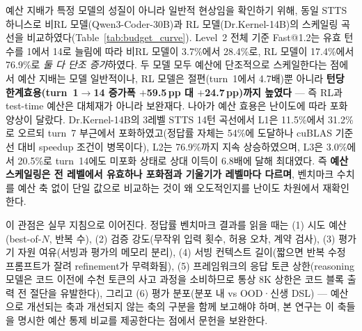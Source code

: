 \documentclass[sigplan,screen,review,anonymous]{acmart}
\begin{document}
\begin{table}[t]
\centering
\caption{STTS 턴 수에 따른 Fast@1.2(전체) 곡선(단위 \%). 동일 KernelGYM STTS 하니스에서 유효 턴 수만 1$\to$14로 확장하여 측정하였다. Qwen3-30B는 비RL 모델, Dr.Kernel-14B(DrK)는 커널 특화 RL 모델이다. 두 모델 모두 예산에 단조 스케일하나, RL 모델은 절편과 턴당 기울기를 모두 높이며, 레벨별로 포화점(L1 turn~7 부근)과 기울기(L3 미포화)가 다르다.}
\label{tab:budget_curve}
\end{table}

예산 지배가 특정 모델의 성질이 아니라 일반적 현상임을 확인하기 위해, 동일 STTS 하니스로 비RL 모델(Qwen3-Coder-30B)과 RL 모델(Dr.Kernel-14B)의 스케일링 곡선을 비교하였다(Table~\ref{tab:budget_curve}). Level~2 전체 기준 Fast@1.2는 유효 턴 수를 1에서 14로 늘림에 따라 비RL 모델이 3.7\%에서 28.4\%로, RL 모델이 17.4\%에서 76.9\%로 \emph{둘 다 단조 증가}하였다. 두 모델 모두 예산에 단조적으로 스케일한다는 점에서 예산 지배는 모델 일반적이나, RL 모델은 절편(turn~1에서 4.7배)뿐 아니라 \textbf{턴당 한계효용(turn~1$\to$14 증가폭 $+$59.5\,pp 대 $+$24.7\,pp)까지 높였다} --- 즉 RL과 test-time 예산은 대체재가 아니라 보완재다. 나아가 예산 효용은 난이도에 따라 포화 양상이 달랐다. Dr.Kernel-14B의 3레벨 STTS 14턴 곡선에서 L1은 11.5\%에서 31.2\%로 오르되 turn~7 부근에서 포화하였고(정답률 자체는 54\%에 도달하나 cuBLAS 기준선 대비 speedup 조건이 병목이다), L2는 76.9\%까지 지속 상승하였으며, L3은 3.0\%에서 20.5\%로 turn~14에도 미포화 상태로 상대 이득이 6.8배에 달해 최대였다. 즉 \textbf{예산 스케일링은 전 레벨에서 유효하나 포화점과 기울기가 레벨마다 다르며}, 벤치마크 수치를 예산 축 없이 단일 값으로 비교하는 것이 왜 오도적인지를 난이도 차원에서 재확인한다.

이 관점은 실무 지침으로 이어진다. 정답률 벤치마크 결과를 읽을 때는 (1) 시도 예산(best-of-$N$, 반복 수), (2) 검증 강도(무작위 입력 횟수, 허용 오차, 계약 검사), (3) 평가기 자원 여유(서빙과 평가의 메모리 분리), (4) 서빙 컨텍스트 길이(짧으면 반복 수정 프롬프트가 잘려 refinement가 무력화됨), (5) 프레임워크의 응답 토큰 상한(reasoning 모델은 코드 이전에 수천 토큰의 사고 과정을 소비하므로 통상 8K 상한은 코드 블록 출력 전 절단을 유발한다), 그리고 (6) 평가 분포(분포 내 vs OOD·신생 DSL) --- 예산으로 개선되는 축과 개선되지 않는 축의 구분을 함께 보고해야 하며, 본 연구는 이 축들을 명시한 예산 통제 비교를 제공한다는 점에서 문헌을 보완한다.
\end{document}
